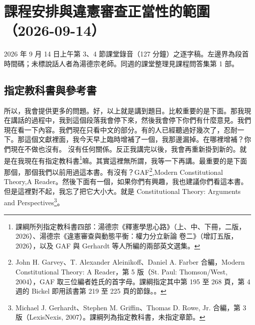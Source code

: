 \chapter{課程安排與違憲審查正當性的範圍（2026-09-14）}

2026 年 9 月 14 日上午第 3、4 節課堂錄音（127 分鐘）之逐字稿。左邊界為段首時間碼；未標說話人者為湯德宗老師。同週的課堂整理見課程問答集第 1 部。


\section{指定教科書與參考書}

\hypertarget{w01:cue:1}{}所以，我會提供更多的問題。好，以上就是講到題目。比較重要的是下面。那我現在講話的過程中，我到這個段落我會停下來，然後我會停下你們有什麼意見。我們現在看一下內容。我們現在只看中文的部分。有的人已經聽過好幾次了，忍耐一下。那這個文獻裡面，我今天早上臨時增補了一個，我那邊漏掉。在哪裡增補？你們現在不做也沒有。
\hypertarget{w01:cue:2}{}沒有任何關係。反正我講完以後，我會再重新掛到新的。就是在我現在有指定教科書\footnote{課綱所列指定教科書四部：湯德宗《釋憲學思心路》（上、中、下冊，二版，2026）、湯德宗《違憲審查與動態平衡：權力分立新論 卷二》（增訂五版，2026），以及 GAF 與 Gerhardt 等人所編的兩部英文選集。}嘛。其實這裡無所謂，我等一下再講。最重要的是下面那個，那個我們以前用過這本書。有沒有？GAF\footnote{John H. Garvey、T. Alexander Aleinikoff、Daniel A. Farber 合編，Modern Constitutional Theory: A Reader，第 5 版（St. Paul: Thomson/West, 2004），GAF 取三位編者姓氏的首字母。課綱指定其中第 195 至 268 頁，第 4 週的 Bickel 即用該書第 219 至 225 頁的節錄。\cite{garvey2004}。},Modern Constitutional Theory,A Reader。然後下面有一個，如果你們有興趣，我也建議你們看這本書。但是這裡對不起，我忘了把它大小大。就是 Constitutional Theory: Arguments and Perspectives\footnote{Michael J. Gerhardt、Stephen M. Griffin、Thomas D. Rowe, Jr. 合編，第 3 版（LexisNexis, 2007）。課綱列為指定教科書，未指定章節。}。

